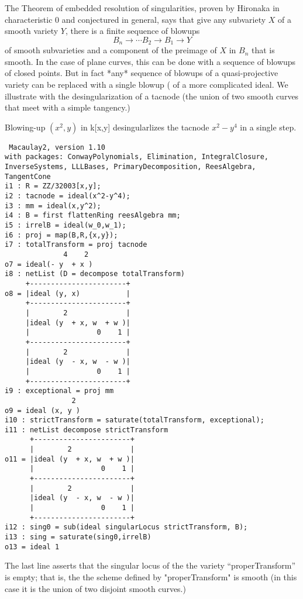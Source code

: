 \documentclass[twoside,12pt, leqno]{amsart}
\begin{document}
The Theorem of embedded resolution of singularities, proven by Hironaka in characteristic 0 and conjectured in general, says that give any subvariety $X$ of a smooth variety $Y$, there is
a finite sequence of blowups 
$$
B_n \to \cdots B_2 \to B_1 \to Y
$$
of smooth subvarieties  and a component of the preimage of
$X$ in $B_n$ that is smooth. In the case of plane curves, this can be done with a sequence of blowups of closed points. But in fact *any* sequence of blowups of a quasi-projective variety can be replaced with a single blowup (\cite[Theorem II.7.17]{Hartshorne} of a more complicated ideal. We illustrate with the desingularization of a tacnode (the union of two smooth curves that meet with a simple tangency.)

\begin{example}
Blowing-up $(x^2,y)$ in k[x,y] desingularlizes the tacnode $x^2-y^4$ in a single step. 
\end{example}
\begin{footnotesize}
 \begin{verbatim}
 Macaulay2, version 1.10
with packages: ConwayPolynomials, Elimination, IntegralClosure, InverseSystems, LLLBases, PrimaryDecomposition, ReesAlgebra, TangentCone
i1 : R = ZZ/32003[x,y];
i2 : tacnode = ideal(x^2-y^4);
i3 : mm = ideal(x,y^2);
i4 : B = first flattenRing reesAlgebra mm;
i5 : irrelB = ideal(w_0,w_1);
i6 : proj = map(B,R,{x,y});
i7 : totalTransform = proj tacnode
              4    2
o7 = ideal(- y  + x )
i8 : netList (D = decompose totalTransform)
     +-----------------------+
o8 = |ideal (y, x)           |
     +-----------------------+
     |        2              |
     |ideal (y  + x, w  + w )|
     |                0    1 |
     +-----------------------+
     |        2              |
     |ideal (y  - x, w  - w )|
     |                0    1 |
     +-----------------------+
i9 : exceptional = proj mm
                2
o9 = ideal (x, y )
i10 : strictTransform = saturate(totalTransform, exceptional);
i11 : netList decompose strictTransform
      +-----------------------+
      |        2              |
o11 = |ideal (y  + x, w  + w )|
      |                0    1 |
      +-----------------------+
      |        2              |
      |ideal (y  - x, w  - w )|
      |                0    1 |
      +-----------------------+
i12 : sing0 = sub(ideal singularLocus strictTransform, B);
i13 : sing = saturate(sing0,irrelB)
o13 = ideal 1
\end{verbatim}
\end{footnotesize}
The last line asserts that the singular locus of the the variety ``properTransform'' is empty;
that is, the the scheme defined by "properTransform" is smooth (in this case it is the union
of two disjoint smooth curves.)
\end{document}
